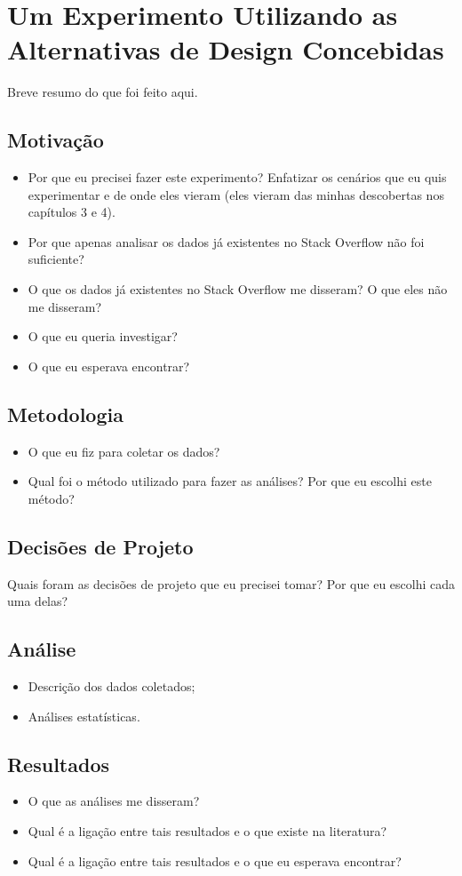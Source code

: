 \chapter{Um Experimento Utilizando as Alternativas de Design Concebidas}
Breve resumo do que foi feito aqui.
\section{Motivação}
\begin{itemize}
\item Por que eu precisei fazer este experimento? Enfatizar os cenários que eu quis experimentar e de onde eles vieram (eles vieram das minhas descobertas nos capítulos 3 e 4).
\item Por que apenas analisar os dados já existentes no Stack Overflow não foi suficiente? 
\item O que os dados já existentes no Stack Overflow me disseram? O que eles não me disseram?
\item O que eu queria investigar?
\item O que eu esperava encontrar?
\end{itemize}
\section{Metodologia}
\begin{itemize}
\item O que eu fiz para coletar os dados?
\item Qual foi o método utilizado para fazer as análises? Por que eu escolhi este método?
\end{itemize}
\section{Decisões de Projeto}
Quais foram as decisões de projeto que eu precisei tomar? Por que eu escolhi cada uma delas?
\section{Análise}
\begin{itemize}
\item Descrição dos dados coletados;
\item Análises estatísticas.
\end{itemize}
\section{Resultados}
\begin{itemize}
\item O que as análises me disseram?
\item Qual é a ligação entre tais resultados e o que existe na literatura?
\item Qual é a ligação entre tais resultados e o que eu esperava encontrar?
\end{itemize}